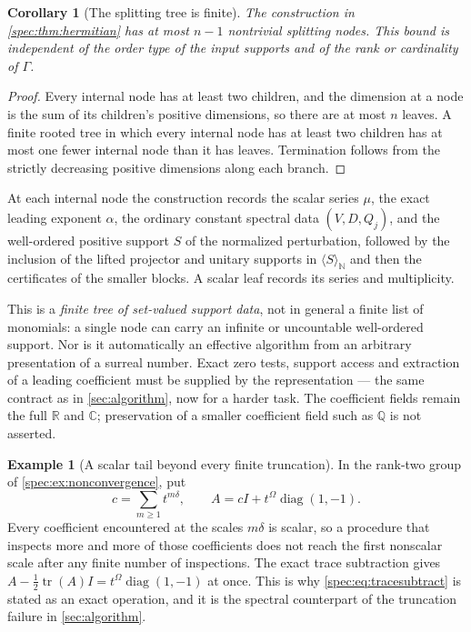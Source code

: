 \documentclass[11pt,a4paper]{article}
\numberwithin{equation}{section}
\newtheorem{corollary}[corollary]{Corollary}
\theoremstyle{definition}
\newtheorem{example}[example]{Example}
\theoremstyle{remark}
\newcommand{\R}{\mathbb R}
\newcommand{\C}{\mathbb C}
\newcommand{\Q}{\mathbb Q}
\newcommand{\N}{\mathbb N}
\newcommand{\tr}{\operatorname{tr}}
\newcommand{\diag}{\operatorname{diag}}
\begin{document}
\begin{corollary}[The splitting tree is finite]\label{spec:cor:tree}
The construction in \cref{spec:thm:hermitian} has at most $n-1$ nontrivial
splitting nodes. This bound is independent of the order type of the input
supports and of the rank or cardinality of $\Gamma$.
\end{corollary}
\begin{proof}
Every internal node has at least two children, and the dimension at a node
is the sum of its children's positive dimensions, so there are at most $n$
leaves. A finite rooted tree in which every internal node has at least two
children has at most one fewer internal node than it has leaves. Termination
follows from the strictly decreasing positive dimensions along each branch.
\end{proof}

At each internal node the construction records the scalar series $\mu$, the
exact leading exponent $\alpha$, the ordinary constant spectral data
$(V,D,Q_j)$, and the well-ordered positive support $S$ of the normalized
perturbation, followed by the inclusion of the lifted projector and unitary
supports in $\langle S\rangle_\N$ and then the certificates of the smaller
blocks. A scalar leaf records its series and multiplicity.

This is a \emph{finite tree of set-valued support data}, not in general a
finite list of monomials: a single node can carry an infinite or uncountable
well-ordered support. Nor is it automatically an effective algorithm from an
arbitrary presentation of a surreal number. Exact zero tests, support access
and extraction of a leading coefficient must be supplied by the
representation --- the same contract as in \cref{sec:algorithm}, now for a
harder task. The coefficient fields remain the full $\R$ and $\C$;
preservation of a smaller coefficient field such as $\Q$ is not asserted.

\begin{example}[A scalar tail beyond every finite truncation]\label{spec:ex:tail}
In the rank-two group of \cref{spec:ex:nonconvergence}, put
\[
 c=\sum_{m\ge1}t^{m\delta},\qquad A=cI+t^\Omega\diag(1,-1).
\]
Every coefficient encountered at the scales $m\delta$ is scalar, so a
procedure that inspects more and more of those coefficients does not reach
the first nonscalar scale after any finite number of inspections. The exact
trace subtraction gives $A-\tfrac12\tr(A)I=t^\Omega\diag(1,-1)$ at once.
This is why \eqref{spec:eq:tracesubtract} is stated as an exact operation,
and it is the spectral counterpart of the truncation failure in
\cref{sec:algorithm}.
\end{example}
\end{document}
